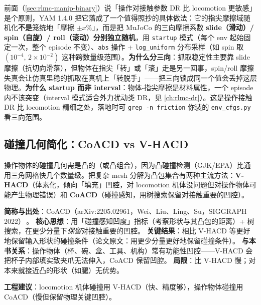 \begin{note}
前面（\cref{sec:rlmc-manip-binary}）说「操作对接触参数 DR 比 locomotion 更敏感」是个原则，YAM 1.4.0 把它落成了一个值得照抄的具体做法：它的指尖摩擦域随机化\textbf{不是}笼统地「摩擦 $\pm x\%$」，而是把 MuJoCo 的三向摩擦系数 \textbf{slide（滑动）/ spin（自旋）/ roll（滚动）分别独立随机}，用 \verb|startup| 模式（每个 env 起始固定一次，整个 episode 不变）、\verb|abs| 操作 + \verb|log_uniform| 分布采样（如 spin 取 $(10^{-4},\,2\times10^{-2})$ 这种跨数量级范围）。\textbf{为什么分三向}：抓取稳定性主要靠 slide 摩擦（抗切向滑落），但物体在指尖「转」或「滚」走是另一回事，spin/roll 摩擦失真会让仿真里稳的抓取在真机上「转脱手」——把三向锁成同一个值会丢掉这层物理。\textbf{为什么 startup 而非 interval}：物体-指尖摩擦是材料属性，一个 episode 内不该突变（interval 模式适合外力扰动类 DR，见 \cref{ch:rlmc-dr}）。这是操作接触 DR 比 locomotion 精细之处，落地时可 \verb|grep -n friction| 你装的 \verb|env_cfgs.py| 看三向范围。
\end{note}

\subsection{碰撞几何简化：CoACD vs V-HACD}
\label{sec:rlmc-manip-coacd}

操作物体的碰撞几何需是凸的（或凸组合），因为凸碰撞检测（GJK/EPA）比通用三角网格快几个数量级。把复杂 mesh 分解为凸包集合有两种主流方法：\textbf{V-HACD}（体素化，倾向「填充」凹腔，对 locomotion 机体没问题但对操作物体可能产生物理错误）和 \textbf{CoACD}（碰撞感知，用树搜索保留对接触重要的凹腔）。

\begin{paper}\label{paper:rlmc-manip-coacd}
\textbf{简称与出处}：CoACD（arXiv:2205.02961，Wei、Liu、Ling、Su，SIGGRAPH 2022）\,\cite{wei2022coacd}。
\textbf{核心思想}：用「碰撞感知凹度」指标（考察形状与其凸包的距离）+ 树搜索，在更少分量下\emph{保留}对接触重要的凹腔。
\textbf{关键结果}：相比 V-HACD 等更好地保留输入形状的碰撞条件（论文原文：用更少分量更好地保留碰撞条件）。
\textbf{与本书关系}：操作物体（杯、碗、盒、工具、机构）常有功能性凹腔——V-HACD 会把杯子内部填实致夹爪无法伸入，CoACD 保留凹腔。
\textbf{局限}：比 V-HACD 慢；对本来就接近凸的形状（如腿）无优势。
\end{paper}

\textbf{工程建议}：locomotion 机体碰撞用 V-HACD（快、精度够），操作物体碰撞用 CoACD（慢但保留物理关键凹腔）。

